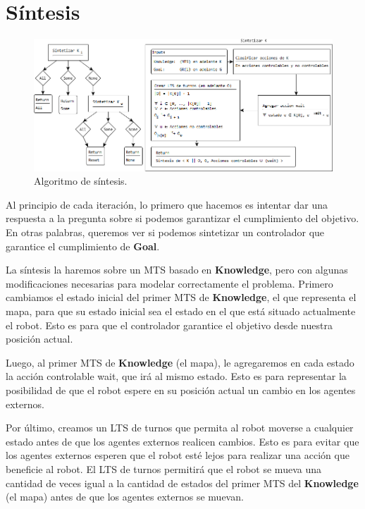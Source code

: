 \section{Síntesis}

\begin{figure}[H]
  \centering
    \includegraphics[width=1.0\textwidth]{Imagenes/Algoritmo/Algoritmo_sintetizar.png}
  \caption{Algoritmo de síntesis.}
  \label{fig:Algoritmo_sintetizar}
\end{figure}

Al principio de cada iteración, lo primero que hacemos es intentar dar una respuesta a la pregunta sobre si podemos garantizar el cumplimiento del objetivo. 
En otras palabras, queremos ver si podemos sintetizar un controlador que garantice el cumplimiento de \textbf{Goal}.


La síntesis la haremos sobre un MTS basado en \textbf{Knowledge}, pero con algunas modificaciones necesarias para modelar correctamente el problema. 
Primero cambiamos el estado inicial del primer MTS de \textbf{Knowledge}, el que representa el mapa, para que su estado inicial sea el estado en el que está 
situado actualmente el robot. Esto es para que el controlador garantice el objetivo desde nuestra posición actual.


Luego, al primer MTS de \textbf{Knowledge} (el mapa), le agregaremos en cada estado la acción controlable wait, que irá al mismo estado. 
Esto es para representar la posibilidad de que el robot espere en su posición actual un cambio en los agentes externos.


Por último, creamos un LTS de turnos que permita al robot moverse a cualquier estado antes de que los agentes externos realicen cambios. Esto es para evitar que los 
agentes externos esperen que el robot esté lejos para realizar una acción que beneficie al robot. El LTS de turnos permitirá que el robot se mueva una cantidad 
de veces igual a la cantidad de estados del primer MTS del \textbf{Knowledge} (el mapa) antes de que los agentes externos se muevan.


